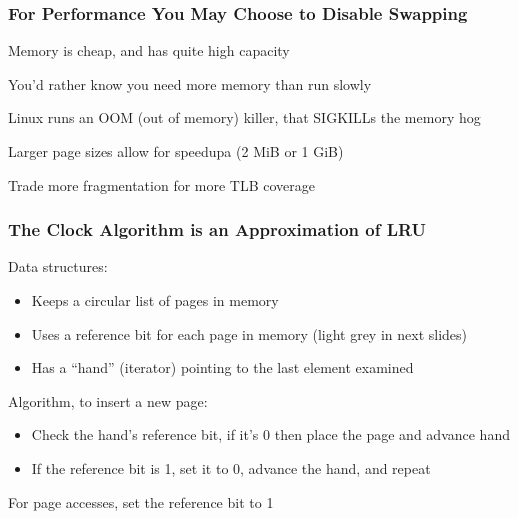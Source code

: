   \begin{frame}
    \frametitle{For Performance You May Choose to Disable Swapping}

    Memory is cheap, and has quite high capacity

    \hspace{2em} You'd rather know you need more memory than run slowly

    \hspace{4em} Linux runs an OOM (out of memory) killer, that SIGKILLs the memory hog

    \vspace{2em}

    Larger page sizes allow for speedupa (2 MiB or 1 GiB)

    \hspace{2em} Trade more fragmentation for more TLB coverage
  \end{frame}

  \begin{frame}
    \frametitle{The Clock Algorithm is an Approximation of LRU}

    Data structures:
    \begin{itemize}
      \item Keeps a circular list of pages in memory
      \item Uses a reference bit for each page in memory (light grey in next slides)
      \item Has a ``hand'' (iterator) pointing to the last element examined
    \end{itemize}

    \vspace{2em}

    Algorithm, to insert a new page:
    \begin{itemize}
      \item Check the hand's reference bit, if it's 0 then place the page and advance hand
      \item If the reference bit is 1, set it to 0, advance the hand, and repeat
    \end{itemize}

    \vspace{2em}

    For page accesses, set the reference bit to 1
  \end{frame}

